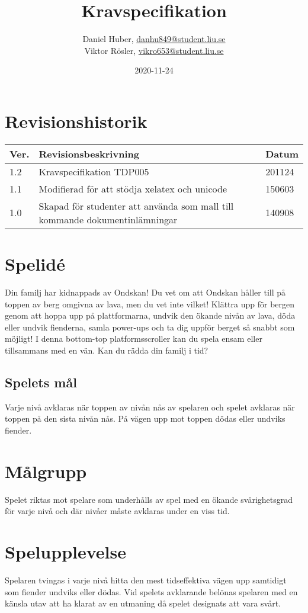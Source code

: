 \documentclass{TDP005mall}
\author{Daniel Huber, \url{danhu849@student.liu.se}\\
  Viktor Rösler, \url{vikro653@student.liu.se}}
\title{Kravspecifikation}
\date{2020-11-24}
\begin{document}
\projectpage
\tableofcontents
\newpage
\section{Revisionshistorik}
\begin{table}[!h]
\begin{tabularx}{\linewidth}{|l|X|l|}
\hline
  Ver. & Revisionsbeskrivning & Datum \\\hline
1.2 & Kravspecifikation TDP005 & 201124 \\\hline
1.1 & Modifierad för att stödja xelatex och unicode & 150603 \\\hline
1.0 & Skapad för studenter att använda som mall till
kommande dokumentinlämningar & 140908 \\\hline
\end{tabularx}
\end{table}


\section{Spelid\'{e} }
Din familj har kidnappads av Ondskan! Du vet om att Ondskan håller till på toppen av berg omgivna av lava, men du vet inte vilket! Klättra upp för bergen genom att hoppa upp på plattformarna, undvik den ökande nivån av lava, döda eller undvik fienderna, samla power-ups och ta dig uppför berget så snabbt som möjligt! I denna bottom-top platformsscroller kan du spela ensam eller tillsammans med en vän. Kan du rädda din familj i tid?

\subsection{Spelets mål}
Varje nivå avklaras när toppen av nivån nås av spelaren och spelet avklaras när toppen på den sista nivån nås. På vägen upp mot toppen dödas eller undviks fiender. 

\section{Målgrupp}%
Spelet riktas mot spelare som underhålls av spel med en ökande svårighetsgrad för varje nivå och där nivåer måste avklaras under en viss tid. 

\section{Spelupplevelse}%
Spelaren tvingas i varje nivå hitta den mest tidseffektiva vägen upp samtidigt som fiender undviks eller dödas. Vid spelets avklarande belönas spelaren med en känsla utav att ha klarat av en utmaning då spelet designats att vara svårt.
\end{document}
